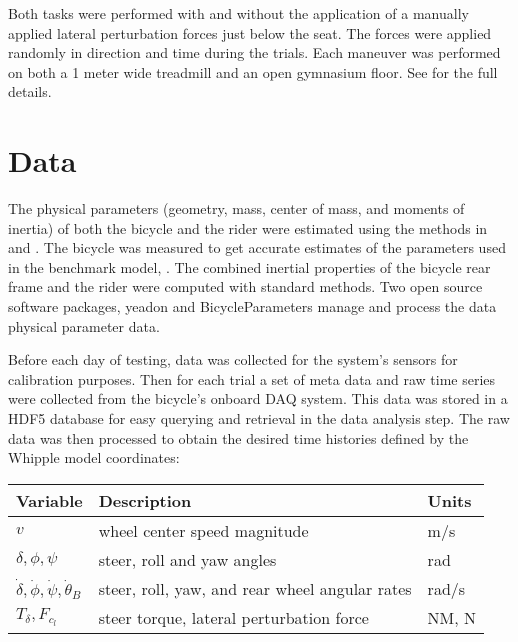 \documentclass[a4paper]{article}
\begin{document}
Both tasks were performed with and without the application of a manually
applied lateral perturbation forces just below the seat. The forces were
applied randomly in direction and time during the trials. Each maneuver was
performed on both a 1 meter wide treadmill and an open gymnasium floor. See
\cite{Moore2012} for the full details.

\section{Data}
\label{sec:data}

The physical parameters (geometry, mass, center of mass, and moments of
inertia) of both the bicycle and the rider were estimated using the methods in
\cite{Moore2012} and \cite{Yeadon1990}. The bicycle was measured to get
accurate estimates of the parameters used in the benchmark model,
\cite{Meijaard2007}. The combined inertial properties of the bicycle rear frame
and the rider were computed with standard methods. Two open source software
packages, yeadon \cite{Dembia2011} and BicycleParameters \cite{Moore2011}
manage and process the data physical parameter data. %


Before each day of testing, data was collected for the system's sensors for
calibration purposes. Then for each trial a set of meta data and raw time
series were collected from the bicycle's onboard DAQ system. This data was
stored in a HDF5 database for easy querying and retrieval in the data analysis
step. The raw data was then processed to obtain the desired time histories
defined by the Whipple model coordinates:

\begin{table}
  \begin{tabular}{lll}
    Variable                                            & Description                                    & Units \\
    \hline
    $v$                                                 & wheel center speed magnitude                   & m/s \\
    $\delta,\phi,\psi$                                  & steer, roll and yaw angles                     & rad \\
    $\dot{\delta},\dot{\phi},\dot{\psi},\dot{\theta}_B$ & steer, roll, yaw, and rear wheel angular rates & rad/s \\
    $T_\delta,F_{c_l}$                                  & steer torque, lateral perturbation force       & NM, N
  \end{tabular}
\end{table}
\end{document}
